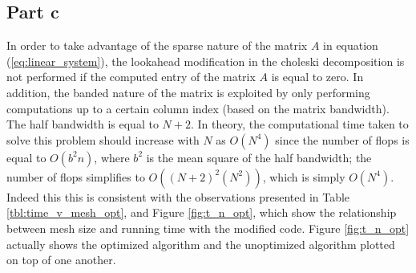 \documentclass[11pt]{amsart}
\begin{document}
\subsection*{Part c} In order to take advantage of the sparse nature of the matrix $A$ in equation (\ref{eq:linear_system}), the lookahead modification in the choleski decomposition is not performed if the computed entry of the matrix $A$ is equal to zero. In addition, the banded nature of the matrix is exploited by only performing computations up to a certain column index (based on the matrix bandwidth). The half bandwidth is equal to $N + 2$. In theory, the computational time taken to solve this problem should increase with $N$ as $O(N^4)$ since the number of flops is equal to $O(b^2 n)$, where $b^2$ is the mean square of the half bandwidth; the number of flops simplifies to $O((N+2)^2 (N^2))$, which is simply $O(N^4)$. Indeed this this is consistent with the observations presented in Table \ref{tbl:time_v_mesh_opt}, and Figure \ref{fig:t_n_opt}, which show the relationship between mesh size and running time with the modified code. Figure \ref{fig:t_n_opt} actually shows the optimized algorithm and the unoptimized algorithm plotted on top of one another.
\end{document}
